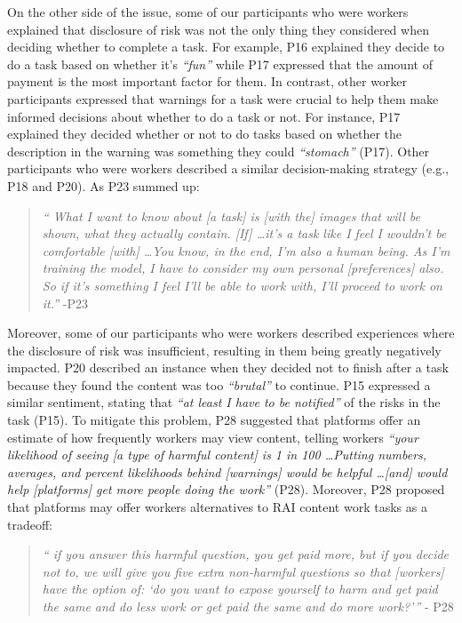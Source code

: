 On the other side of the issue, some of our participants who were workers explained that disclosure of risk was not the only thing they considered when deciding whether to complete a task. For example, P16 explained they decide to do a task based on whether it's \textit{``fun''} while P17 expressed that the amount of payment is the most important factor for them. In contrast, other worker participants expressed that warnings for a task were crucial to help them make informed decisions about whether to do a task or not. For instance, P17 explained they decided whether or not to do tasks based on whether the description in the warning was something they could \textit{``stomach''} (P17). Other participants who were workers described a similar decision-making strategy (e.g., P18 and P20). As P23 summed up: 
\begin{quote}
    \textit{`` What I want to know about [a task] is [with the] images that will be shown, what they actually contain. [If] \dots it's a task like I feel I wouldn't be comfortable [with] \dots You know, in the end, I'm also a human being. As I'm training the model, I have to consider my own personal [preferences] also. So if it's something I feel I'll be able to work with, I'll proceed to work on it.''} -P23
\end{quote}
Moreover, some of our participants who were workers described experiences where the disclosure of risk was insufficient, resulting in them being greatly negatively impacted. P20 described an instance when they decided not to finish after a task because they found the content was too \textit{``brutal''} to continue. P15 expressed a similar sentiment, stating that \textit{``at least I have to be notified''} of the risks in the task (P15). To mitigate this problem, P28 suggested that platforms offer an estimate of how frequently workers may view content, telling workers \textit{``your likelihood of seeing [a type of harmful content] is 1 in 100 \dots Putting numbers, averages, and percent likelihoods behind [warnings] would be helpful \dots [and] would help [platforms] get more people doing the work''} (P28). Moreover, P28 proposed that platforms may offer workers alternatives to RAI content work tasks as a tradeoff: 
\begin{quote}
    \textit{`` if you answer this harmful question, you get paid more, but if you decide not to, we will give you five extra non-harmful questions so that [workers] have the option of: `do you want to expose yourself to harm and get paid the same and do less work or get paid the same and do more work?'''} - P28
\end{quote}
